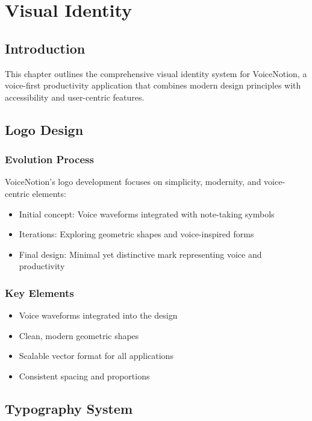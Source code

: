 \chapter{Visual Identity}

\section{Introduction}
This chapter outlines the comprehensive visual identity system for VoiceNotion, a voice-first productivity application that combines modern design principles with accessibility and user-centric features.

\section{Logo Design}
\subsection{Evolution Process}
VoiceNotion's logo development focuses on simplicity, modernity, and voice-centric elements:
\begin{itemize}
    \item Initial concept: Voice waveforms integrated with note-taking symbols
    \item Iterations: Exploring geometric shapes and voice-inspired forms
    \item Final design: Minimal yet distinctive mark representing voice and productivity
\end{itemize}

\subsection{Key Elements}
\begin{itemize}
    \item Voice waveforms integrated into the design
    \item Clean, modern geometric shapes
    \item Scalable vector format for all applications
    \item Consistent spacing and proportions
\end{itemize}

\section{Typography System}
